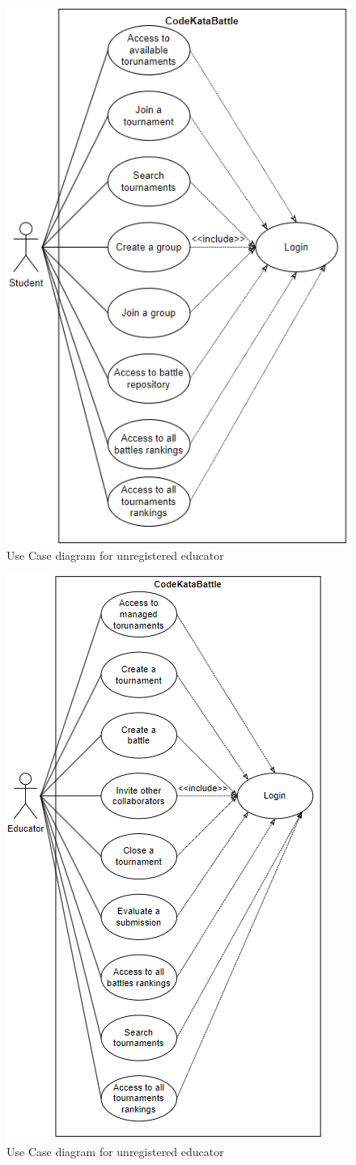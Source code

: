 \documentclass[12pt, a4paper]{report}
\begin{document}
        \begin{figure}[H]
            \centering
            \includegraphics[width=0.65\linewidth]{images/stud.png}
            \caption{Use Case diagram for unregistered educator}
        \end{figure}
        \begin{figure}[H]
            \centering
            \includegraphics[width=0.65\linewidth]{images/ed.png}
            \caption{Use Case diagram for unregistered educator}
        \end{figure}
\end{document}
